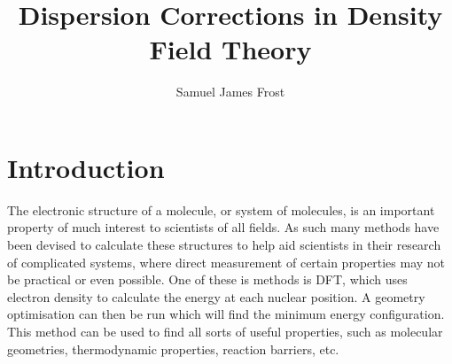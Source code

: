 \documentclass[10pt,a4paper,twocolumn,twoside]{extarticle}
\title{Dispersion Corrections in Density Field Theory}
\author{Samuel James Frost}
\begin{document}
	\thispagestyle{empty}
	\twocolumn[
	\begin{@twocolumnfalse}
		\begin{center}
			\vspace*{-10mm}
			{\Large\scshape\papertitle}\\
			\vspace{2ex}
			{\itshape\paperauthor}
		\end{center}
		\centering\noindent\rule{0.9\textwidth}{0.4pt}
		\begin{abstract}
			{\lipsum[5]}
		\end{abstract}
		\centering\noindent\rule{0.9\textwidth}{0.4pt}\\
		\vspace{1cm}
	\end{@twocolumnfalse}]
	\tableofcontents

	
	\section{Introduction}
	The electronic structure of a molecule, or system of molecules, is an important property of much interest to scientists of all fields. As such many methods have been devised to calculate these structures to help aid scientists in their research of complicated systems, where direct measurement of certain properties may not be practical or even possible. One of these is methods is DFT, which uses electron density to calculate the energy at each nuclear position. A geometry optimisation can then be run which will find the minimum energy configuration. \cite{Parr1989} This method can be used to find all sorts of useful properties, such as molecular geometries, thermodynamic properties, reaction barriers, etc.\cite{Jones2015}
\end{document}
